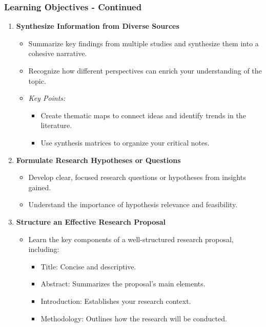 \documentclass[aspectratio=169]{beamer}
\begin{document}
\begin{frame}[fragile]
    \frametitle{Learning Objectives - Continued}
    \begin{enumerate}[resume]
        \item \textbf{Synthesize Information from Diverse Sources}
        \begin{itemize}
            \item Summarize key findings from multiple studies and synthesize them into a cohesive narrative.
            \item Recognize how different perspectives can enrich your understanding of the topic.
            \item \textit{Key Points:}
                \begin{itemize}
                    \item Create thematic maps to connect ideas and identify trends in the literature.
                    \item Use synthesis matrices to organize your critical notes.
                \end{itemize}
        \end{itemize}

        \item \textbf{Formulate Research Hypotheses or Questions}
        \begin{itemize}
            \item Develop clear, focused research questions or hypotheses from insights gained.
            \item Understand the importance of hypothesis relevance and feasibility.
        \end{itemize}

        \item \textbf{Structure an Effective Research Proposal}
        \begin{itemize}
            \item Learn the key components of a well-structured research proposal, including:
            \begin{itemize}
                \item Title: Concise and descriptive.
                \item Abstract: Summarizes the proposal's main elements.
                \item Introduction: Establishes your research context.
                \item Methodology: Outlines how the research will be conducted.
            \end{itemize}
        \end{itemize}


\end{enumerate}
\end{frame}
\end{document}
